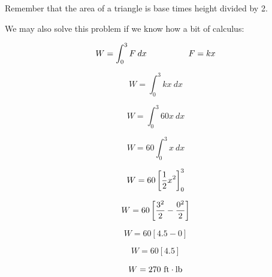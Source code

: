





Remember that the area of a triangle is base times height divided by 2.

\vskip 10pt

We may also solve this problem if we know how a bit of calculus:

$$W = \int_0^3 F \> dx \hbox{\hskip 50pt} F = kx$$

$$W = \int_0^3 kx \> dx$$

$$W = \int_0^3 60x \> dx$$

$$W = 60 \int_0^3 x \> dx$$

$$W = 60 \left[ {1 \over 2}x^2 \right]_0^3$$

$$W = 60 \left[ {3^2 \over 2} - {0^2 \over 2} \right]$$

$$W = 60 \left[ 4.5 - 0 \right]$$

$$W = 60 \left[ 4.5 \right]$$

$$W = 270 \hbox{ ft} \cdot \hbox{lb}$$




